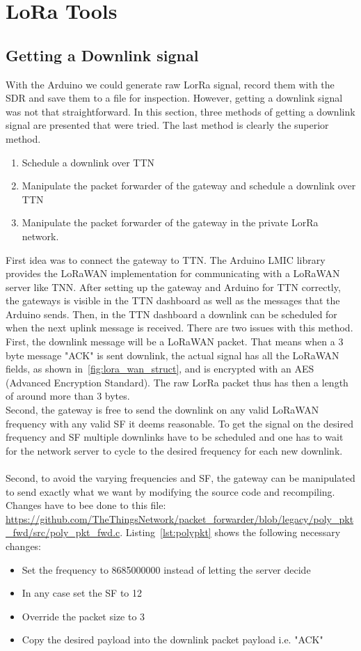 \chapter{LoRa Tools}
\label{chap:lora_tools}
\section{Getting a Downlink signal}
With the Arduino we could generate raw LorRa signal, record them with the SDR and save them to a file for inspection.
However, getting a downlink signal was not that straightforward. 
In this section, three methods of getting a downlink signal are presented that were tried.
The last method is clearly the superior method.

\begin{enumerate}
    \item Schedule a downlink over TTN
    \item Manipulate the packet forwarder of the gateway and schedule a downlink over TTN
    \item Manipulate the packet forwarder of the gateway in the private LorRa network.
\end{enumerate}

First idea was to connect the gateway to TTN. 
The Arduino LMIC library provides the LoRaWAN implementation for communicating with a LoRaWAN server like TNN.
After setting up the gateway and Arduino for TTN correctly, the gateways is visible in the TTN dashboard as well as 
the messages that the Arduino sends. Then, in the TTN dashboard a downlink can be scheduled for when the next uplink message 
is received. There are two issues with this method. First, the downlink message will be a LoRaWAN packet. That means when a 3 byte message "ACK"
is sent downlink, the actual signal has all the LoRaWAN fields, as shown in~\ref{fig:lora_wan_struct}, and is encrypted with an AES (Advanced Encryption Standard).
The raw LorRa packet thus has then a length of around more than 3 bytes.\\
Second, the gateway is free to send the downlink on any valid LoRaWAN frequency with any valid SF it deems reasonable. To get the signal on the desired frequency and SF 
multiple downlinks have to be scheduled and one has to wait for the network server to cycle to the desired frequency for each new downlink. 
\\
\\
Second, to avoid the varying frequencies and SF, the gateway can be manipulated to send exactly what we want by modifying the source code 
and recompiling.
Changes have to bee done to this file: \url{https://github.com/TheThingsNetwork/packet_forwarder/blob/legacy/poly_pkt_fwd/src/poly_pkt_fwd.c}.
Listing~\ref{lst:polypkt} shows the following necessary changes:
\begin{itemize}
    \item Set the frequency to 8685000000 instead of letting the server decide
    \item In any case set the SF to 12
    \item Override the packet size to 3
    \item Copy the desired payload into the downlink packet payload i.e. "ACK"
\end{itemize}

